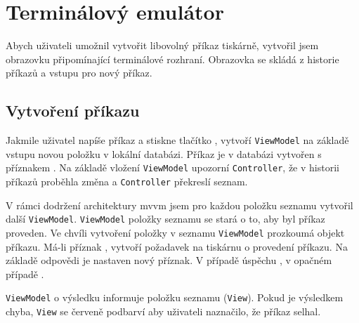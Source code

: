 \section{Terminálový emulátor}

Abych uživateli umožnil vytvořit libovolný příkaz tiskárně, vytvořil jsem obrazovku připomínající terminálové rozhraní.
Obrazovka se skládá z historie příkazů a vstupu pro nový příkaz.

\subsection{Vytvoření příkazu}

Jakmile uživatel napíše příkaz a stiskne tlačítko , vytvoří \texttt{ViewModel} na základě vstupu novou položku v lokální databázi.
Příkaz je v databázi vytvořen s příznakem .
Na základě vložení \texttt{ViewModel} upozorní \texttt{Controller}, že v historii příkazů proběhla změna a \texttt{Controller} překreslí seznam.

V rámci dodržení architektury \acrshort{mvvm} jsem pro každou položku seznamu vytvořil další \texttt{ViewModel}.
\texttt{ViewModel} položky seznamu se stará o to, aby byl příkaz proveden.
Ve chvíli vytvoření položky v seznamu \texttt{ViewModel} prozkoumá objekt příkazu.
Má-li příznak , vytvoří požadavek na tiskárnu o provedení příkazu.
Na základě odpovědi je nastaven nový příznak.
V případě úspěchu , v opačném případě .

\texttt{ViewModel} o výsledku informuje položku seznamu (\texttt{View}).
Pokud je výsledkem chyba, \texttt{View} se červeně podbarví aby uživateli naznačilo, že příkaz selhal.
